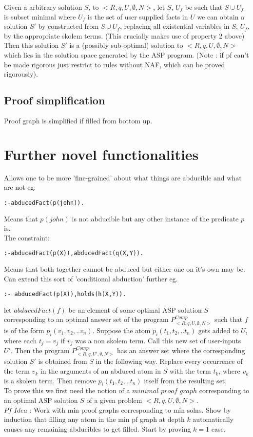 \documentclass{article}
\begin{document}
Given a arbitrary solution $S$, to $<R,q,U,\emptyset,N>$, let $S$, $U_{f}$ be such that $S\cup U_{f}$ is subset minimal where $U_{f}$ is the set of user supplied facts in $U$ we can obtain a solution $S'$ by constructed from $S\cup U_{f}$, replacing all existential variables in $S$, $U_{f}$, by the appropriate skolem terms. (This crucially makes use of property 2 above) Then this solution $S'$ is a (possibly sub-optimal) solution to $<R,q,U,\emptyset,N>$ which lies in the solution space generated by the ASP program.  (Note : if pf can't be made rigorous just restrict to rules without NAF, which can be proved rigorously).
\subsection{Proof simplification}
Proof graph is simplified if filled from bottom up.

\section{Further novel functionalities}
Allows one to be more 'fine-grained' about what things are abducible and what are not eg:
\begin{verbatim}
:-abducedFact(p(john)).    
\end{verbatim}
Means that $p(john)$ is not abducible but any other instance of the predicate $p$ is.\\
\newline
The constraint:
\begin{verbatim}
:-abducedFact(p(X)),abducedFact(q(X,Y)).
\end{verbatim}
Means that both together cannot be abduced but either one on it's own may be. Can extend this sort of 'conditional abduction' further eg.
\begin{verbatim}
:- abducedFact(p(X)),holds(h(X,Y)).  
\end{verbatim}


let $abducedFact(f)$ be an element of some optimal ASP solution $S$ corresponding to an optimal answer set of the program $P_{<R,q,U,\emptyset,N>}^{Comp}$ such that $f$ is of the form $p_{i}(v_{1},v_{2},..v_{n})$. Suppose the atom $p_{i}(t_{1},t_{2},..t_{n})$ gets added to $U$, where each $t_{j} = v_{j}$ if $v_{j}$ was a non skolem term. Call this new set of user-inputs $U'$. Then the program $P_{<R,q,U',\emptyset,N>}^{Comp}$ has an answer set where the corresponding solution $S'$ is obtained from $S$ in the following way. Replace every occurrence of the term $v_{k}$ in the arguments of an abduced atom in $S$ with the term $t_{k}$, where $v_{k}$ is a skolem term. Then remove $p_{i}(t_{1},t_{2},..t_{n})$ itself from the resulting set.\\
\newline
To prove this we first need the notion of a $minimal$ $proof$ $graph$ corresponding to an optimal ASP solution $S$ of a given problem $<R,q,U,\emptyset,N>$. \\
\newline
$\textit{Pf Idea}$ : Work with min proof graphs corresponding to min solns. Show by induction that filling any atom in the min pf graph at depth $k$ automatically causes any remaining abducibles to get filled. Start by proving $k=1$ case.
\end{document}
